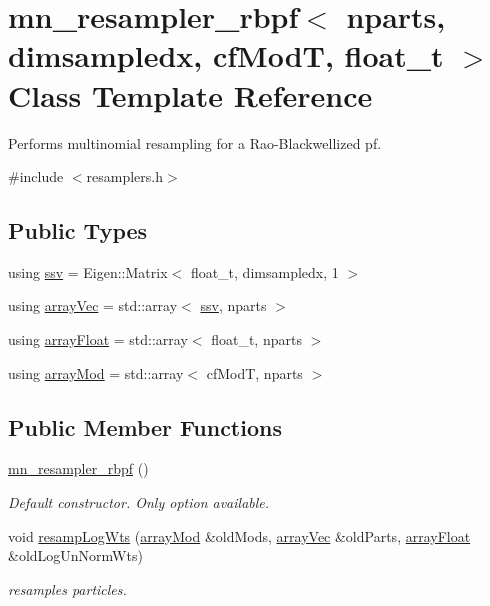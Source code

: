 \hypertarget{classmn__resampler__rbpf}{}\section{mn\+\_\+resampler\+\_\+rbpf$<$ nparts, dimsampledx, cf\+ModT, float\+\_\+t $>$ Class Template Reference}
\label{classmn__resampler__rbpf}


Performs multinomial resampling for a Rao-\/\+Blackwellized pf.  




{\ttfamily \#include $<$resamplers.\+h$>$}

\subsection*{Public Types}
\begin{DoxyCompactItemize}
\item 
using \hyperlink{classmn__resampler__rbpf_aff8bcd12cfe60425c4406262a9640d68}{ssv} = Eigen\+::\+Matrix$<$ float\+\_\+t, dimsampledx, 1 $>$
\item 
using \hyperlink{classmn__resampler__rbpf_a9eddf10f48c19b555276bbd23826044b}{array\+Vec} = std\+::array$<$ \hyperlink{classmn__resampler__rbpf_aff8bcd12cfe60425c4406262a9640d68}{ssv}, nparts $>$
\item 
using \hyperlink{classmn__resampler__rbpf_a43fa641c6d15c8ee79da47d6af02ac16}{array\+Float} = std\+::array$<$ float\+\_\+t, nparts $>$
\item 
using \hyperlink{classmn__resampler__rbpf_a268fe176a23e146b8f0c1acbaf8625b3}{array\+Mod} = std\+::array$<$ cf\+ModT, nparts $>$
\end{DoxyCompactItemize}
\subsection*{Public Member Functions}
\begin{DoxyCompactItemize}
\item 
\mbox{\label{classmn__resampler__rbpf_acfefe5df6a03b0be01b34477b844a486}} 
\hyperlink{classmn__resampler__rbpf_acfefe5df6a03b0be01b34477b844a486}{mn\+\_\+resampler\+\_\+rbpf} ()
\begin{DoxyCompactList}\small\item\em Default constructor. Only option available. \end{DoxyCompactList}\item 
void \hyperlink{classmn__resampler__rbpf_a1ae1ffd0262e853c601659509fa5e8ea}{resamp\+Log\+Wts} (\hyperlink{classmn__resampler__rbpf_a268fe176a23e146b8f0c1acbaf8625b3}{array\+Mod} \&old\+Mods, \hyperlink{classmn__resampler__rbpf_a9eddf10f48c19b555276bbd23826044b}{array\+Vec} \&old\+Parts, \hyperlink{classmn__resampler__rbpf_a43fa641c6d15c8ee79da47d6af02ac16}{array\+Float} \&old\+Log\+Un\+Norm\+Wts)
\begin{DoxyCompactList}\small\item\em resamples particles. \end{DoxyCompactList}\end{DoxyCompactItemize}
